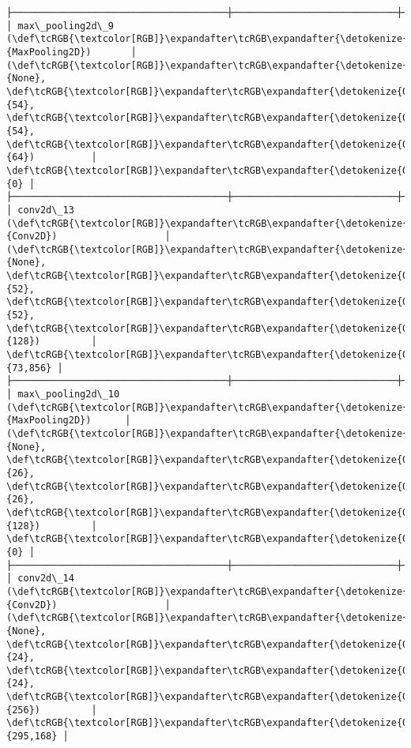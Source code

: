 \documentclass[11pt]{article}
\begin{document}
\begin{Verbatim}[commandchars=\\\{\}]
├──────────────────────────────────────┼─────────────────────────────┼─────────────────┤
│ max\_pooling2d\_9 (\def\tcRGB{\textcolor[RGB]}\expandafter\tcRGB\expandafter{\detokenize{0,135,255}}{MaxPooling2D})       │ (\def\tcRGB{\textcolor[RGB]}\expandafter\tcRGB\expandafter{\detokenize{0,215,255}}{None}, \def\tcRGB{\textcolor[RGB]}\expandafter\tcRGB\expandafter{\detokenize{0,175,0}}{54}, \def\tcRGB{\textcolor[RGB]}\expandafter\tcRGB\expandafter{\detokenize{0,175,0}}{54}, \def\tcRGB{\textcolor[RGB]}\expandafter\tcRGB\expandafter{\detokenize{0,175,0}}{64})          │               \def\tcRGB{\textcolor[RGB]}\expandafter\tcRGB\expandafter{\detokenize{0,175,0}}{0} │
├──────────────────────────────────────┼─────────────────────────────┼─────────────────┤
│ conv2d\_13 (\def\tcRGB{\textcolor[RGB]}\expandafter\tcRGB\expandafter{\detokenize{0,135,255}}{Conv2D})                   │ (\def\tcRGB{\textcolor[RGB]}\expandafter\tcRGB\expandafter{\detokenize{0,215,255}}{None}, \def\tcRGB{\textcolor[RGB]}\expandafter\tcRGB\expandafter{\detokenize{0,175,0}}{52}, \def\tcRGB{\textcolor[RGB]}\expandafter\tcRGB\expandafter{\detokenize{0,175,0}}{52}, \def\tcRGB{\textcolor[RGB]}\expandafter\tcRGB\expandafter{\detokenize{0,175,0}}{128})         │          \def\tcRGB{\textcolor[RGB]}\expandafter\tcRGB\expandafter{\detokenize{0,175,0}}{73,856} │
├──────────────────────────────────────┼─────────────────────────────┼─────────────────┤
│ max\_pooling2d\_10 (\def\tcRGB{\textcolor[RGB]}\expandafter\tcRGB\expandafter{\detokenize{0,135,255}}{MaxPooling2D})      │ (\def\tcRGB{\textcolor[RGB]}\expandafter\tcRGB\expandafter{\detokenize{0,215,255}}{None}, \def\tcRGB{\textcolor[RGB]}\expandafter\tcRGB\expandafter{\detokenize{0,175,0}}{26}, \def\tcRGB{\textcolor[RGB]}\expandafter\tcRGB\expandafter{\detokenize{0,175,0}}{26}, \def\tcRGB{\textcolor[RGB]}\expandafter\tcRGB\expandafter{\detokenize{0,175,0}}{128})         │               \def\tcRGB{\textcolor[RGB]}\expandafter\tcRGB\expandafter{\detokenize{0,175,0}}{0} │
├──────────────────────────────────────┼─────────────────────────────┼─────────────────┤
│ conv2d\_14 (\def\tcRGB{\textcolor[RGB]}\expandafter\tcRGB\expandafter{\detokenize{0,135,255}}{Conv2D})                   │ (\def\tcRGB{\textcolor[RGB]}\expandafter\tcRGB\expandafter{\detokenize{0,215,255}}{None}, \def\tcRGB{\textcolor[RGB]}\expandafter\tcRGB\expandafter{\detokenize{0,175,0}}{24}, \def\tcRGB{\textcolor[RGB]}\expandafter\tcRGB\expandafter{\detokenize{0,175,0}}{24}, \def\tcRGB{\textcolor[RGB]}\expandafter\tcRGB\expandafter{\detokenize{0,175,0}}{256})         │         \def\tcRGB{\textcolor[RGB]}\expandafter\tcRGB\expandafter{\detokenize{0,175,0}}{295,168} │

\end{Verbatim}
\end{document}
